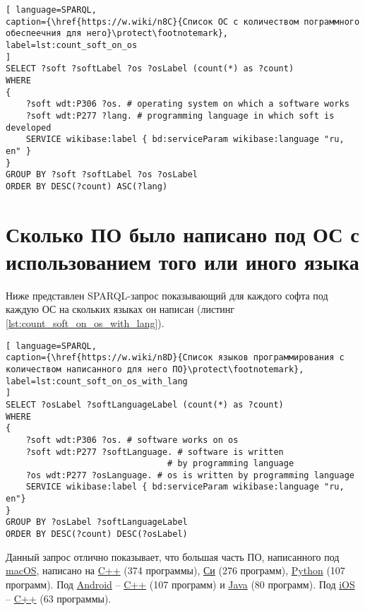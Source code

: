 \begin{lstlisting}[ language=SPARQL, 
caption={\href{https://w.wiki/n8C}{Список ОС с количеством пограммного обеспеечния для него}\protect\footnotemark},
label=lst:count_soft_on_os
]
SELECT ?soft ?softLabel ?os ?osLabel (count(*) as ?count)
WHERE
{
	?soft wdt:P306 ?os. # operating system on which a software works
	?soft wdt:P277 ?lang. # programming language in which soft is developed
	SERVICE wikibase:label { bd:serviceParam wikibase:language "ru, en" }
}
GROUP BY ?soft ?softLabel ?os ?osLabel
ORDER BY DESC(?count) ASC(?lang)
\end{lstlisting}


\section{Сколько ПО было написано под ОС с использованием того или иного языка}
Ниже представлен SPARQL-запрос показывающий для каждого софта под каждую ОС на скольких языках он написан (листинг \ref{lst:count_soft_on_os_with_lang}).


\begin{lstlisting}[ language=SPARQL, 
caption={\href{https://w.wiki/n8D}{Список языков программирования с количеством написанного для него ПО}\protect\footnotemark},
label=lst:count_soft_on_os_with_lang
]
SELECT ?osLabel ?softLanguageLabel (count(*) as ?count)
WHERE
{
	?soft wdt:P306 ?os. # software works on os
	?soft wdt:P277 ?softLanguage. # software is written 
                                # by programming language
	?os wdt:P277 ?osLanguage. # os is written by programming language
	SERVICE wikibase:label { bd:serviceParam wikibase:language "ru, en"}
}
GROUP BY ?osLabel ?softLanguageLabel
ORDER BY DESC(?count) DESC(?osLabel)
\end{lstlisting}

 Данный запрос отлично показывает, что большая часть ПО, написанного под \href{https://www.wikidata.org/wiki/Q14116}{macOS}, написано на \href{https://www.wikidata.org/wiki/Q2407}{C++} (374 программы), \href{https://www.wikidata.org/wiki/Q15777}{Си} (276 программ), \href{https://www.wikidata.org/wiki/Q28865}{Python} (107 программ).
 Под \href{https://www.wikidata.org/wiki/Q94}{Android} -- \href{https://www.wikidata.org/wiki/Q2407}{C++} (107 программ) и \href{https://www.wikidata.org/wiki/Q251}{Java} (80 программ).
 Под \href{https://www.wikidata.org/wiki/Q48493}{iOS} -- \href{https://www.wikidata.org/wiki/Q2407}{C++} (63 программы).


